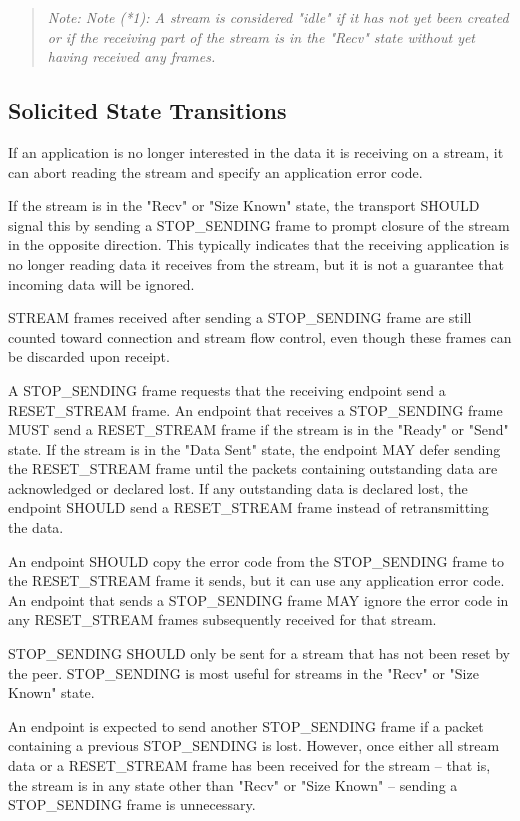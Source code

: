 \documentclass{article}
\begin{document}
\begin{quote}
\textit{Note: Note (*1): A stream is considered "idle" if it has not yet been created or if the receiving part of the stream is in the "Recv" state without yet having received any frames.}
\end{quote}

\subsection{Solicited State Transitions}

If an application is no longer interested in the data it is receiving on a stream, it can abort reading the stream and specify an application error code.

If the stream is in the "Recv" or "Size Known" state, the transport SHOULD signal this by sending a STOP\_SENDING frame to prompt closure of the stream in the opposite direction.  This typically indicates that the receiving application is no longer reading data it receives from the stream, but it is not a guarantee that incoming data will be ignored.

STREAM frames received after sending a STOP\_SENDING frame are still counted toward connection and stream flow control, even though these frames can be discarded upon receipt.

A STOP\_SENDING frame requests that the receiving endpoint send a RESET\_STREAM frame.  An endpoint that receives a STOP\_SENDING frame MUST send a RESET\_STREAM frame if the stream is in the "Ready" or "Send" state.  If the stream is in the "Data Sent" state, the endpoint MAY defer sending the RESET\_STREAM frame until the packets containing outstanding data are acknowledged or declared lost.  If any outstanding data is declared lost, the endpoint SHOULD send a RESET\_STREAM frame instead of retransmitting the data.

An endpoint SHOULD copy the error code from the STOP\_SENDING frame to the RESET\_STREAM frame it sends, but it can use any application error code.  An endpoint that sends a STOP\_SENDING frame MAY ignore the error code in any RESET\_STREAM frames subsequently received for that stream.

STOP\_SENDING SHOULD only be sent for a stream that has not been reset by the peer.  STOP\_SENDING is most useful for streams in the "Recv" or "Size Known" state.

An endpoint is expected to send another STOP\_SENDING frame if a packet containing a previous STOP\_SENDING is lost.  However, once either all stream data or a RESET\_STREAM frame has been received for the stream -- that is, the stream is in any state other than "Recv" or "Size Known" -- sending a STOP\_SENDING frame is unnecessary.
\end{document}
